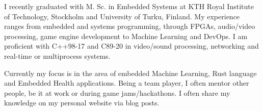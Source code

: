 \documentclass[11pt, a4paper]{awesome-cv}
\begin{document}
\makecvheader

\newline
I recently graduated with M. Sc. in Embedded Systems at KTH Royal Institute of Technology, Stockholm and University of Turku, Finland. My experience ranges from embedded and systems programming, through FPGAs, audio/video processing, game engine development to Machine Learning and DevOps. I am proficient with C++98-17 and C89-20 in video/sound processing, networking and real-time or multiprocess systems.

Currently my focus is in the area of embedded Machine Learning, Rust language and Embedded Health applications. Being a team player, I often mentor other people, be it at work or during game jams/hackathons. I often share my knowledge on my personal website via blog posts.



\vspace{20mm} %




\end{document}
